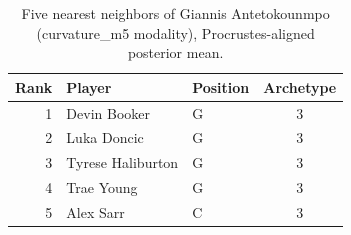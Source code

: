 \begin{table}[htbp]
  \centering\small
  \begin{tabular}{rllc}
    \toprule
    Rank & Player & Position & Archetype \\
    \midrule
    1 & Devin Booker & G & 3 \\
    2 & Luka Doncic & G & 3 \\
    3 & Tyrese Haliburton & G & 3 \\
    4 & Trae Young & G & 3 \\
    5 & Alex Sarr & C & 3 \\
    \bottomrule
  \end{tabular}
  \caption{Five nearest neighbors of Giannis Antetokounmpo (curvature_m5 modality), Procrustes-aligned posterior mean.}
  \label{tab:Giannis_Antetokounmpo_neighbors_curvature_m5}
\end{table}

